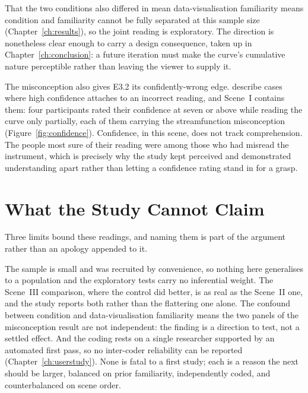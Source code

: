 That the two conditions also differed in mean data-visualisation familiarity means condition and familiarity cannot be fully separated at this sample size (Chapter~\ref{ch:results}), so the joint reading is exploratory. The direction is nonetheless clear enough to carry a design consequence, taken up in Chapter~\ref{ch:conclusion}: a future iteration must make the curve's cumulative nature perceptible rather than leaving the viewer to supply it.

The misconception also gives E3.2 its confidently-wrong edge. \textcite{fischer2020} describe cases where high confidence attaches to an incorrect reading, and Scene~I contains them: four participants rated their confidence at seven or above while reading the curve only partially, each of them carrying the streamfunction misconception (Figure~\ref{fig:confidence}). Confidence, in this scene, does not track comprehension. The people most sure of their reading were among those who had misread the instrument, which is precisely why the study kept perceived and demonstrated understanding apart rather than letting a confidence rating stand in for a grasp.

\section{What the Study Cannot Claim}
\label{sec:disc-limits}

Three limits bound these readings, and naming them is part of the argument rather than an apology appended to it.

The sample is small and was recruited by convenience, so nothing here generalises to a population and the exploratory tests carry no inferential weight. The Scene~III comparison, where the control did better, is as real as the Scene~II one, and the study reports both rather than the flattering one alone. The confound between condition and data-visualisation familiarity means the two panels of the misconception result are not independent: the finding is a direction to test, not a settled effect. And the coding rests on a single researcher supported by an automated first pass, so no inter-coder reliability can be reported (Chapter~\ref{ch:userstudy}). None is fatal to a first study; each is a reason the next should be larger, balanced on prior familiarity, independently coded, and counterbalanced on scene order.

